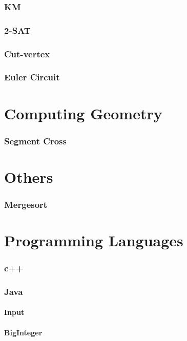 \documentclass[a4paper, twocolumn, landscape]{article}
\begin{document}
\section{KM}

\section{2-SAT}

\section{Cut-vertex}

\section{Euler Circuit}


\part{Computing Geometry}
\section{Segment Cross}


\part{Others}
\section{Mergesort}


\part{Programming Languages}
\section{c++}


\section{Java}
\subsection*{Input}

\subsection*{BigInteger}

\end{document}
